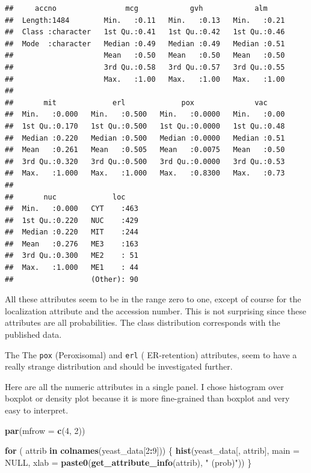 \documentclass[]{book}
\newenvironment{Shaded}{\begin{snugshade}}{\end{snugshade}}
\newcommand{\ControlFlowTok}[1]{\textcolor[rgb]{0.13,0.29,0.53}{\textbf{#1}}}
\newcommand{\DataTypeTok}[1]{\textcolor[rgb]{0.13,0.29,0.53}{#1}}
\newcommand{\DecValTok}[1]{\textcolor[rgb]{0.00,0.00,0.81}{#1}}
\newcommand{\KeywordTok}[1]{\textcolor[rgb]{0.13,0.29,0.53}{\textbf{#1}}}
\newcommand{\NormalTok}[1]{#1}
\newcommand{\OperatorTok}[1]{\textcolor[rgb]{0.81,0.36,0.00}{\textbf{#1}}}
\newcommand{\OtherTok}[1]{\textcolor[rgb]{0.56,0.35,0.01}{#1}}
\newcommand{\StringTok}[1]{\textcolor[rgb]{0.31,0.60,0.02}{#1}}
\begin{document}
\begin{verbatim}
##     accno                mcg            gvh            alm      
##  Length:1484        Min.   :0.11   Min.   :0.13   Min.   :0.21  
##  Class :character   1st Qu.:0.41   1st Qu.:0.42   1st Qu.:0.46  
##  Mode  :character   Median :0.49   Median :0.49   Median :0.51  
##                     Mean   :0.50   Mean   :0.50   Mean   :0.50  
##                     3rd Qu.:0.58   3rd Qu.:0.57   3rd Qu.:0.55  
##                     Max.   :1.00   Max.   :1.00   Max.   :1.00  
##                                                                 
##       mit             erl             pox              vac      
##  Min.   :0.000   Min.   :0.500   Min.   :0.0000   Min.   :0.00  
##  1st Qu.:0.170   1st Qu.:0.500   1st Qu.:0.0000   1st Qu.:0.48  
##  Median :0.220   Median :0.500   Median :0.0000   Median :0.51  
##  Mean   :0.261   Mean   :0.505   Mean   :0.0075   Mean   :0.50  
##  3rd Qu.:0.320   3rd Qu.:0.500   3rd Qu.:0.0000   3rd Qu.:0.53  
##  Max.   :1.000   Max.   :1.000   Max.   :0.8300   Max.   :0.73  
##                                                                 
##       nuc             loc     
##  Min.   :0.000   CYT    :463  
##  1st Qu.:0.220   NUC    :429  
##  Median :0.220   MIT    :244  
##  Mean   :0.276   ME3    :163  
##  3rd Qu.:0.300   ME2    : 51  
##  Max.   :1.000   ME1    : 44  
##                  (Other): 90
\end{verbatim}

All these attributes seem to be in the range zero to one, except of course for the localization attribute and the accession number. This is not surprising since these attributes are all probabilities. The class distribution corresponds with the published data.

The
The \texttt{pox} (Peroxisomal) and \texttt{erl} ( ER-retention) attributes, seem to have a really strange distribution and should be investigated further.

Here are all the numeric attributes in a single panel. I chose histogram over boxplot or density plot because it is more fine-grained than boxplot and very easy to interpret.

\begin{Shaded}
\begin{Highlighting}[]
\KeywordTok{par}\NormalTok{(}\DataTypeTok{mfrow =} \KeywordTok{c}\NormalTok{(}\DecValTok{4}\NormalTok{, }\DecValTok{2}\NormalTok{))}

\ControlFlowTok{for}\NormalTok{ ( attrib }\ControlFlowTok{in} \KeywordTok{colnames}\NormalTok{(yeast_data[}\DecValTok{2}\OperatorTok{:}\DecValTok{9}\NormalTok{])) \{}
    \KeywordTok{hist}\NormalTok{(yeast_data[, attrib],}
         \DataTypeTok{main =} \OtherTok{NULL}\NormalTok{,}
         \DataTypeTok{xlab =} \KeywordTok{paste0}\NormalTok{(}\KeywordTok{get_attribute_info}\NormalTok{(attrib), }\StringTok{" (prob)"}\NormalTok{))}
\NormalTok{\}}
\end{Highlighting}
\end{Shaded}
\end{document}
